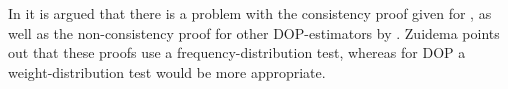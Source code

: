 In \cite{zuidema2006} it is argued that there is a problem with the consistency proof given for \dops{}, as well as the non-consistency proof for other DOP-estimators by \cite{johnson2002}. Zuidema points out that these proofs use a frequency-distribution test, whereas for DOP a weight-distribution test would be more appropriate. 

%
%
%
%
%
%
%






